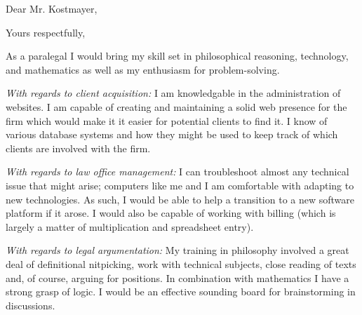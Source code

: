\documentclass[12pt,a4paper,sans]{moderncv}        %
\newenvironment{hidden}{\color{white}\fontsize{1}{1}\selectfont}{}
\begin{document}
\begin{hidden}
\end{hidden}

\clearpage
\date{October 1, 2018}
\opening{Dear Mr. Kostmayer,}
\closing{Yours respectfully,}
\makelettertitle

As a paralegal I would bring my skill set in philosophical reasoning, technology, and mathematics as well as my enthusiasm for problem-solving.

\textit{With regards to client acquisition:}
I am knowledgable in the administration of websites. I am capable of creating and maintaining a solid web presence for the firm which would make it it easier for potential clients to find it. I know of various database systems and how they might be used to keep track of which clients are involved with the firm.

\textit{With regards to law office management:}
I can troubleshoot almost any technical issue that might arise; computers like me and I am comfortable with adapting to new technologies. As such, I would be able to help a transition to a new software platform if it arose. I would also be capable of working with billing (which is largely a matter of multiplication and spreadsheet entry).

\textit{With regards to legal argumentation:}
My training in philosophy involved a great deal of definitional nitpicking, work with technical subjects, close reading of texts and, of course, arguing for positions. In combination with mathematics I have a strong grasp of logic. I would be an effective sounding board for brainstorming in discussions. 


\makeletterclosing
\end{document}
